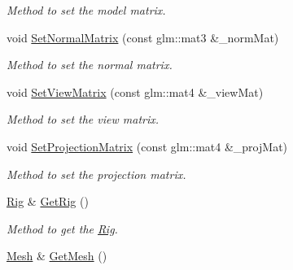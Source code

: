 \begin{DoxyCompactItemize}
\begin{DoxyCompactList}\small\item\em Method to set the model matrix. \end{DoxyCompactList}\item 
void \hyperlink{classModel_a8cffd0fa41ec392fabaa02fce9f2624e}{Set\+Normal\+Matrix} (const glm\+::mat3 \&\+\_\+norm\+Mat)\hypertarget{classModel_a8cffd0fa41ec392fabaa02fce9f2624e}{}\label{classModel_a8cffd0fa41ec392fabaa02fce9f2624e}

\begin{DoxyCompactList}\small\item\em Method to set the normal matrix. \end{DoxyCompactList}\item 
void \hyperlink{classModel_aa98bb18be5df8aef0da8aa47d6e09f19}{Set\+View\+Matrix} (const glm\+::mat4 \&\+\_\+view\+Mat)\hypertarget{classModel_aa98bb18be5df8aef0da8aa47d6e09f19}{}\label{classModel_aa98bb18be5df8aef0da8aa47d6e09f19}

\begin{DoxyCompactList}\small\item\em Method to set the view matrix. \end{DoxyCompactList}\item 
void \hyperlink{classModel_aee6397055a5aa1e964cde1639da05122}{Set\+Projection\+Matrix} (const glm\+::mat4 \&\+\_\+proj\+Mat)\hypertarget{classModel_aee6397055a5aa1e964cde1639da05122}{}\label{classModel_aee6397055a5aa1e964cde1639da05122}

\begin{DoxyCompactList}\small\item\em Method to set the projection matrix. \end{DoxyCompactList}\item 
\hyperlink{classRig}{Rig} \& \hyperlink{classModel_ab41210858b52e222212ec2c9e4bfbed1}{Get\+Rig} ()\hypertarget{classModel_ab41210858b52e222212ec2c9e4bfbed1}{}\label{classModel_ab41210858b52e222212ec2c9e4bfbed1}

\begin{DoxyCompactList}\small\item\em Method to get the \hyperlink{classRig}{Rig}. \end{DoxyCompactList}\item 
\hyperlink{classMesh}{Mesh} \& \hyperlink{classModel_a868b3918a895ab46d6b7f9fdd74106ac}{Get\+Mesh} ()\hypertarget{classModel_a868b3918a895ab46d6b7f9fdd74106ac}{}\label{classModel_a868b3918a895ab46d6b7f9fdd74106ac}


\end{DoxyCompactItemize}
